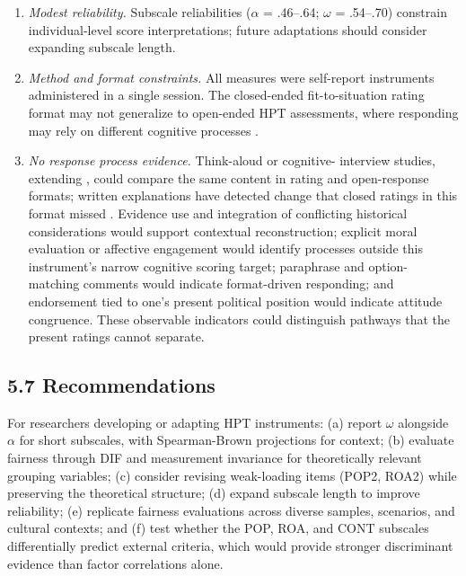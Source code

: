 \documentclass[PCJ,Unicode,screen,mode=plain]{cedram}
\begin{document}
\begin{enumerate}
\item \emph{Modest reliability.} Subscale reliabilities (\(\alpha\) =
   .46--.64; \(\omega\) = .54--.70) constrain individual-level score
   interpretations; future adaptations should consider expanding subscale
   length.

\item \emph{Method and format constraints.} All measures were
  self-report instruments administered in a single session. The
  closed-ended fit-to-situation rating format may not generalize to open-ended HPT
  assessments, where responding may rely on different cognitive
  processes \citep{Smith2017Cognitive,Smith_et_al2018History}.

\item \emph{No response process evidence.} Think-aloud or cognitive-
  interview studies, extending \citet{Huijgen_et_al2017Toward}, could
  compare the same content in rating and open-response formats; written
  explanations have detected change that closed ratings in this format
  missed \citep{Wilschut_Schiphorst2019One}. Evidence
  use and integration of conflicting historical considerations would
  support contextual reconstruction; explicit moral evaluation or
  affective engagement would identify processes outside this
  instrument's narrow cognitive scoring target; paraphrase and option-
  matching comments would indicate format-driven responding; and
  endorsement tied to one's present political position would indicate
  attitude congruence. These observable indicators could distinguish
  pathways that the present ratings cannot separate.

\end{enumerate}

\subsection*{5.7 Recommendations}\label{recommendations}

For researchers developing or adapting HPT instruments: (a) report \(\omega\) alongside \(\alpha\) for short subscales, with Spearman-Brown projections for context; (b) evaluate fairness through DIF and measurement invariance for theoretically relevant grouping variables; (c) consider revising weak-loading items (POP2, ROA2) while preserving the theoretical structure; (d) expand subscale length to improve reliability; (e) replicate fairness evaluations across diverse samples, scenarios, and cultural contexts; and (f) test whether the POP, ROA, and CONT subscales differentially predict external criteria, which would provide stronger discriminant evidence than factor correlations alone.
\end{document}
